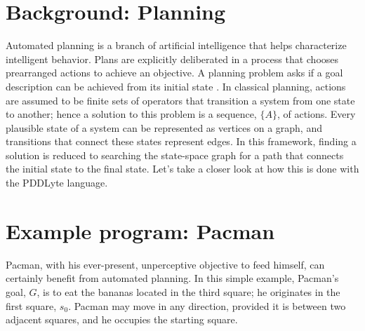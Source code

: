 \documentclass[
a4paper, %
11pt, %
onecolumn, %
openany, %
]{memoir}
\begin{document}
\section{Background: Planning}
{\setlength{\parindent}{0cm}

Automated planning is a branch of artificial intelligence that helps characterize intelligent behavior. Plans are explicitly deliberated in a process that chooses prearranged actions to achieve an objective. A planning problem asks if a goal description can be achieved from its initial state \cite{ai_rn}. In classical planning, actions are assumed to be finite sets of operators that transition a system from one state to another; hence a solution to this problem is a sequence, $\{A\}$, of actions. Every plausible state of a system can be represented as vertices on a  graph, and transitions that connect these states represent edges. In this framework, finding a solution is reduced to searching the state-space graph for a path that connects the initial state to the final state. Let's take a closer look at how this is done with the PDDLyte language.


\section{Example program: Pacman}

Pacman, with his ever-present, unperceptive objective to feed himself, can certainly benefit from automated planning. In this simple example, Pacman's goal, $G$, is to eat the bananas located in the third square; he originates in the first square, $s_0$. Pacman may move in any direction, provided it is between two adjacent squares, and he occupies the starting square.\\

}
\end{document}
